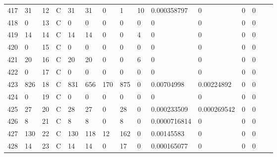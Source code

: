 \begin{longtable}{lllllllllllllll}
	417 & 31                & 12  & C   & 31                & 31                & 0                 & 1    & 10         & 0.000358797    & 0              & 0             & 0            \\
	418 & 0                 & 13  & C   & 0                 & 0                 & 0                 & 0    & 0          & 0              & 0              & 0             & 0            \\
	419 & 14                & 14  & C   & 14                & 14                & 0                 & 0    & 4          & 0              & 0              & 0             & 0            \\
	420 & 0                 & 15  & C   & 0                 & 0                 & 0                 & 0    & 0          & 0              & 0              & 0             & 0            \\
	421 & 20                & 16  & C   & 20                & 20                & 0                 & 0    & 6          & 0              & 0              & 0             & 0            \\
	422 & 0                 & 17  & C   & 0                 & 0                 & 0                 & 0    & 0          & 0              & 0              & 0             & 0            \\
	423 & 826               & 18  & C   & 831               & 656               & 170               & 875  & 0          & 0.00704998     & 0.00224892     & 0             & 0            \\
	424 & 0                 & 19  & C   & 0                 & 0                 & 0                 & 0    & 0          & 0              & 0              & 0             & 0            \\
	425 & 27                & 20  & C   & 28                & 27                & 0                 & 28   & 0          & 0.000233509    & 0.000269542    & 0             & 0            \\
	426 & 8                 & 21  & C   & 8                 & 8                 & 0                 & 8    & 0          & 0.0000716814   & 0              & 0             & 0            \\
	427 & 130               & 22  & C   & 130               & 118               & 12                & 162  & 0          & 0.00145583     & 0              & 0             & 0            \\
	428 & 14                & 23  & C   & 14                & 14                & 0                 & 17   & 0          & 0.000165077    & 0              & 0             & 0            \\

\end{longtable}
